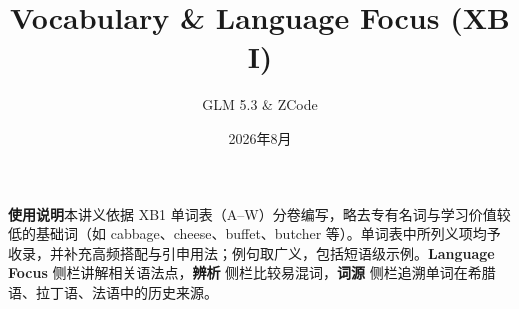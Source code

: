 \documentclass[12pt, a4paper]{ctexart}
\title{Vocabulary \& Language Focus (XB I)}
\author{GLM 5.3 \& ZCode}
\date{2026年8月}
\begin{document}
\maketitle
\begin{cbox}
\textbf{使用说明}\quad 本讲义依据 XB1 单词表（A--W）分卷编写，略去专有名词与学习价值较低的基础词（如 cabbage、cheese、buffet、butcher 等）。单词表中所列义项均予收录，并补充高频搭配与引申用法；例句取广义，包括短语级示例。\textcolor{orange!80!black}{\textbf{Language Focus}} 侧栏讲解相关语法点，\textcolor{TealBlue}{\textbf{辨析}} 侧栏比较易混词，\textcolor{OliveGreen}{\textbf{词源}} 侧栏追溯单词在希腊语、拉丁语、法语中的历史来源。
\end{cbox}
\newpage

\tableofcontents
\newpage










\end{document}
